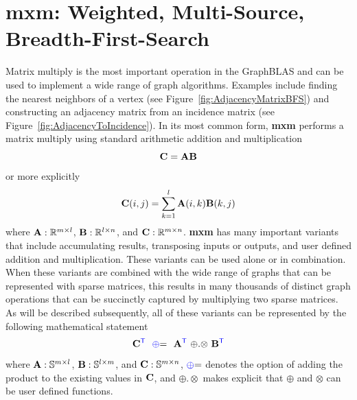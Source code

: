 \section{mxm: Weighted, Multi-Source, Breadth-First-Search}

Matrix multiply is the most important operation in the GraphBLAS and can be used to implement a wide range of graph algorithms.  Examples include finding the nearest neighbors of a vertex (see Figure~\ref{fig:AdjacencyMatrixBFS}) and constructing an adjacency matrix from an incidence matrix (see Figure~\ref{fig:AdjacencyToIncidence}). In its most common form, {\bf mxm} performs a matrix multiply using standard arithmetic addition and multiplication
$$
   {\bf C} = {\bf A} {\bf B}
$$
or more explicitly
$$
   {\bf C}(i,j) = \sum_{k=1}^l {\bf A}(i,k) {\bf B}(k,j)
$$
where ${\bf A}: \mathbb{R}^{m \times l}$,  ${\bf B}: \mathbb{R}^{l \times n}$, and ${\bf C}: \mathbb{R}^{m \times n}$. {\bf mxm} has many important variants that include accumulating results, transposing inputs or outputs, and user defined addition and multiplication.  These variants can be used alone or in combination.  When these variants are combined with the wide range of graphs that can be represented with sparse matrices, this results in many thousands of distinct graph operations that can be succinctly captured by multiplying two sparse matrices.   As will be described subsequently, all of these variants can be represented by the following mathematical statement
$$
   {\bf C}^{\textcolor{blue}{\sf T}} ~~ {\textcolor{blue}{\oplus}}{=} ~~ {\bf A}^{\textcolor{blue}{\sf T}} ~ {\oplus}.{\otimes} ~ {\bf B}^{\textcolor{blue}{\sf T}}
$$
where  ${\bf A}: \mathbb{S}^{m \times l}$,  ${\bf B}: \mathbb{S}^{l \times m}$, and ${\bf C}: \mathbb{S}^{m \times n}$, ${\textcolor{blue}{\oplus}}{=}$ denotes the option of adding the product to the existing values in ${\bf C}$, and ${\oplus}.{\otimes}$ makes explicit that ${\oplus}$ and ${\otimes}$ can be user defined functions.


